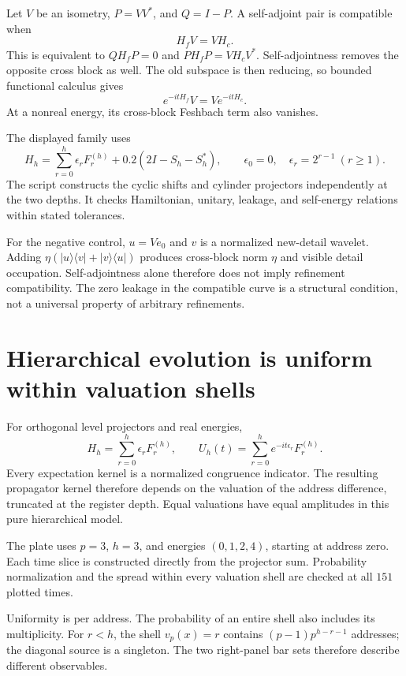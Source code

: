 Let $V$ be an isometry, $P=VV^*$, and $Q=I-P$. A self-adjoint pair is compatible when
\[
H_fV=VH_c.
\]
This is equivalent to $QH_fP=0$ and $PH_fP=VH_cV^*$. Self-adjointness removes the opposite cross block as well. The old subspace is then reducing, so bounded functional calculus gives
\[
e^{-itH_f}V=Ve^{-itH_c}.
\]
At a nonreal energy, its cross-block Feshbach term also vanishes.

The displayed family uses
\[
H_h=\sum_{r=0}^h\epsilon_rF_r^{(h)}
+0.2(2I-S_h-S_h^*),\qquad
\epsilon_0=0,\quad\epsilon_r=2^{r-1}\ (r\ge1).
\]
The script constructs the cyclic shifts and cylinder projectors independently at the two depths. It checks Hamiltonian, unitary, leakage, and self-energy relations within stated tolerances.

For the negative control, $u=Ve_0$ and $v$ is a normalized new-detail wavelet. Adding $\eta(|u\rangle\langle v|+|v\rangle\langle u|)$ produces cross-block norm $\eta$ and visible detail occupation. Self-adjointness alone therefore does not imply refinement compatibility. The zero leakage in the compatible curve is a structural condition, not a universal property of arbitrary refinements.



\clearpage
\section{Hierarchical evolution is uniform within valuation shells}

For orthogonal level projectors and real energies,
\[
H_h=\sum_{r=0}^h\epsilon_rF_r^{(h)},\qquad
U_h(t)=\sum_{r=0}^he^{-it\epsilon_r}F_r^{(h)}.
\]
Every expectation kernel is a normalized congruence indicator. The resulting propagator kernel therefore depends on the valuation of the address difference, truncated at the register depth. Equal valuations have equal amplitudes in this pure hierarchical model.

The plate uses $p=3$, $h=3$, and energies $(0,1,2,4)$, starting at address zero. Each time slice is constructed directly from the projector sum. Probability normalization and the spread within every valuation shell are checked at all $151$ plotted times.

Uniformity is per address. The probability of an entire shell also includes its multiplicity. For $r<h$, the shell $v_p(x)=r$ contains $(p-1)p^{h-r-1}$ addresses; the diagonal source is a singleton. The two right-panel bar sets therefore describe different observables.

